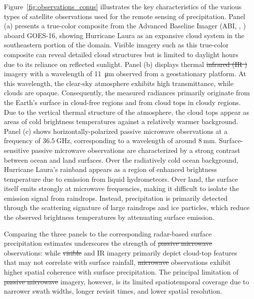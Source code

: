 \documentclass[11pt]{article}
\providecommand{\DIFadd}[1]{{\protect\color{blue}\uwave{#1}}} %
\providecommand{\DIFdel}[1]{{\protect\color{red}\sout{#1}}}                      %
\providecommand{\DIFaddbegin}{} %
\providecommand{\DIFaddend}{} %
\providecommand{\DIFdelbegin}{} %
\providecommand{\DIFdelend}{} %
\begin{document}
Figure~\ref{fig:observations_conus} illustrates the key characteristics of the
various types of satellite observations used for the remote sensing of
precipitation. Panel (a) presents a true-color composite from the Advanced
Baseline Imager (ABI, \citeauthor{Schmit2005Introducing},
\citeyear{Schmit2005Introducing}) aboard GOES-16, showing Hurricane Laura as an
expansive cloud system in the southeastern portion of the domain. Visible
imagery such as this true-color composite can reveal detailed cloud structures
but is limited to daylight hours due to its reliance on reflected sunlight.
Panel (b) displays thermal \DIFdelbegin \DIFdel{infrared (IR ) }\DIFdelend \DIFaddbegin \DIFadd{IR }\DIFaddend imagery with a wavelength of
\SI{11}{\micro \meter} observed from a geostationary platform. At this
wavelength, the clear-sky atmosphere exhibits high transmittance, while clouds
are opaque. Consequently, the measured radiances primarily originate from the
Earth’s surface in cloud-free regions and from cloud tops in cloudy regions. Due
to the vertical thermal structure of the atmosphere, the cloud tops appear as
areas of cold brightness temperatures against a relatively warmer background.
Panel (c) shows horizontally-polarized passive microwave observations at a
frequency of $\SI{36.5}{\giga \hertz}$, corresponding to a wavelength of around
$\SI{8}{\milli \meter}$. Surface-sensitive passive microwave observations are
characterized by a strong contrast between ocean and land surfaces. Over the
radiatively cold ocean background, Hurricane Laura's rainband appears as a
region of enhanced brightness temperature due to emission from liquid
hydrometeors. Over land, the surface itself emits strongly at microwave
frequencies, making it difficult to isolate the emission signal from raindrops.
Instead, precipitation is primarily detected through the scattering signature of
large raindrops and ice particles, which reduce the observed brightness
temperatures by attenuating surface emission.

Comparing the three panels to the corresponding radar-based surface
precipitation estimates underscores the strength of \DIFdelbegin \DIFdel{passive microwave
}\DIFdelend \DIFaddbegin \DIFadd{PMW
}\DIFaddend observations: while \DIFdelbegin \DIFdel{visible }\DIFdelend \DIFaddbegin \DIFadd{Vis }\DIFaddend and IR imagery primarily depict cloud-top features
that may not correlate with surface rainfall, \DIFdelbegin \DIFdel{microwave }\DIFdelend \DIFaddbegin \DIFadd{PMW }\DIFaddend observations exhibit
higher spatial coherence with surface precipitation. The principal limitation of
\DIFdelbegin \DIFdel{passive microwave }\DIFdelend \DIFaddbegin \DIFadd{PMW }\DIFaddend imagery, however, is its limited spatiotemporal coverage due
to narrower swath widths, longer revisit times, and lower spatial resolution.
\end{document}

